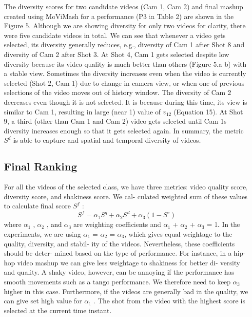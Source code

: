 \documentclass{sig-alternate}
\begin{document}
\begin{enumerate}
The diversity scores for two candidate videos (Cam 1, Cam 2)
and final mashup created using MoViMash for a performance (P3
in Table 2) are shown in the Figure 5. Although we are showing
diversity for only two videos for clarity, there were five candidate
videos in total. We can see that whenever a video gets selected,
its diversity generally reduces, e.g., diversity of Cam 1 after Shot 8
and diversity of Cam 2 after Shot 3. At Shot 4, Cam 1 gets selected
despite low diversity because its video quality is much better than
others (Figure 5.a-b) with a stable view. Sometimes the diversity
increases even when the video is currently selected (Shot 2, Cam 1)
due to change in camera view, or when one of previous selections
of the video moves out of history window. The diversity of Cam 2
decreases even though it is not selected. It is because during this
time, its view is similar to Cam 1, resulting in large (near 1) value
of $v_{12}$ (Equation 15). At Shot 9, a third (other than Cam 1 and Cam
2) video gets selected until Cam 1s diversity increases enough so
that it gets selected again. In summary, the metric $S^d$ is able to
capture and spatial and temporal diversity of videos.
\end{enumerate}

\subsection{Final Ranking}
For all the videos of the selected class, we have three metrics:
video quality score, diversity score, and shakiness score. We cal-
culated weighted sum of these values to calculate final score $S^f$ :
\[S^f = \alpha_1 S^q + \alpha_2 S^d +\alpha_3(1 - S^s)\tag{17}\]
where $\alpha_1$ , $\alpha_2$ , and $\alpha_3$ are weighting coefficients and $\alpha_1$ + $\alpha_2$ +
$\alpha_3$ = 1. In the experiments, we are using $\alpha_1$ = $\alpha_2$ = $\alpha_3$,
which gives equal weightage to the quality, diversity, and stabil-
ity of the videos. Nevertheless, these coefficients should be deter-
mined based on the type of performance. For instance, in a hip-hop
video mashup we can give less weightage to shakiness for better di-
versity and quality. A shaky video, however, can be annoying if the
performance has smooth movements such as a tango performance.
We therefore need to keep $\alpha_3$ higher in this case. Furthermore, if
the videos are generally bad in the quality, we can give set high
value for $\alpha_1$ . The shot from the video with the highest score is
selected at the current time instant.
\end{document}
